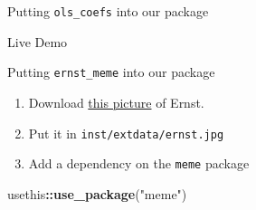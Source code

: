 \documentclass[12pt,ignorenonframetext,compress]{beamer}
\newenvironment{Shaded}{\begin{snugshade}}{\end{snugshade}}
\newcommand{\KeywordTok}[1]{\textcolor[rgb]{0.13,0.29,0.53}{\textbf{#1}}}
\newcommand{\StringTok}[1]{\textcolor[rgb]{0.31,0.60,0.02}{#1}}
\newcommand{\CommentTok}[1]{\textcolor[rgb]{0.56,0.35,0.01}{\textit{#1}}}
\newcommand{\ControlFlowTok}[1]{\textcolor[rgb]{0.13,0.29,0.53}{\textbf{#1}}}
\newcommand{\OperatorTok}[1]{\textcolor[rgb]{0.81,0.36,0.00}{\textbf{#1}}}
\newcommand{\NormalTok}[1]{#1}
\begin{document}
\begin{frame}[fragile]{Putting \texttt{ols\_coefs} into our package}

\begin{Shaded}
\end{Shaded}

Live Demo

\end{frame}

\begin{frame}[fragile]{Putting \texttt{ernst\_meme} into our package}

\begin{enumerate}
\def\labelenumi{\arabic{enumi}.}
\item
  Download
  \href{https://drive.google.com/file/d/1E9PpcxJROCTkF6rJUigAOG5gmyVH7l9c/view?usp=sharing}{this
  picture} of Ernst.
\item
  Put it in \texttt{inst/extdata/ernst.jpg}
\item
  Add a dependency on the \texttt{meme} package
\end{enumerate}

\begin{Shaded}
\begin{Highlighting}[]
\NormalTok{usethis}\OperatorTok{::}\KeywordTok{use_package}\NormalTok{(}\StringTok{"meme"}\NormalTok{)}
\end{Highlighting}
\end{Shaded}

\end{frame}
\end{document}
